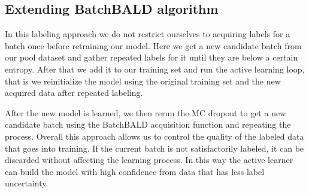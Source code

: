 \documentclass[twoside,11pt]{article}
\begin{document}
\subsection{Extending BatchBALD algorithm}

In this labeling approach we do not restrict ourselves to acquiring labels for a batch once before retraining our model. Here we get a new candidate batch from our pool dataset and gather repeated labels for it until they are below a certain entropy. After that we add it to our training set and run the active learning loop, that is we reinitialize the model using the original training set and the new acquired data after repeated labeling.

After the new model is learned, we then rerun the MC dropout to get a new candidate batch using the BatchBALD acquisition function and repeating the process. Overall this approach allows us to control the quality of the labeled data that goes into training. If the current batch is not satisfactorily labeled, it can be discarded without affecting the learning process. In this way the active learner can build the model with high confidence from data that has less label uncertainty.


\end{document}
